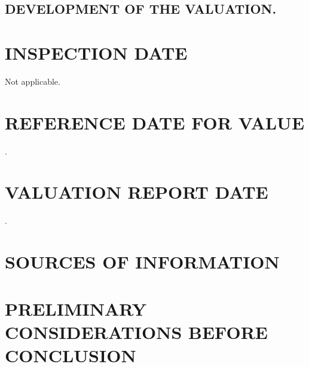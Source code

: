 \documentclass[10pt,letter]{report}
\begin{document}
\setcounter{section}{11}

\subsection{DEVELOPMENT OF THE VALUATION.}\label{sec:k2}










\section{INSPECTION DATE}\label{sec:l}
Not applicable.

\section{REFERENCE DATE FOR VALUE}\label{sec:m}
\fechaValores.

\section{VALUATION REPORT DATE}\label{sec:n}
\fechaInforme.

\section{SOURCES OF INFORMATION}\label{sec:nn}

\section{PRELIMINARY CONSIDERATIONS BEFORE CONCLUSION}\label{sec:o}

\end{document}
